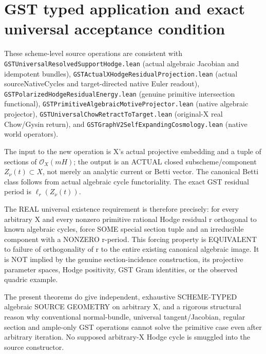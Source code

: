 \documentclass[11pt]{article}
\newcommand{\OO}{\mathcal O}
\begin{document}
\section{GST typed application and exact universal acceptance condition}
These scheme-level source operations are consistent with
\texttt{GSTUniversalResolvedSupportHodge.lean}
(actual algebraic Jacobian and idempotent bundles),
\texttt{GSTActualXHodgeResidualProjection.lean}
(actual sourceNativeCycles and target-directed native
Euler readout),
\texttt{GSTPolarizedHodgeResidualEnergy.lean}
(genuine primitive intersection functional),
\texttt{GSTPrimitiveAlgebraicMotiveProjector.lean}
(native algebraic projector),
\texttt{GSTUniversalChowRetractToTarget.lean}
(original-X real Chow/Gysin return), and
\texttt{GSTGraphV2SelfExpandingCosmology.lean}
(native world operators).

The input to the new operation is X's actual
projective embedding and a tuple of sections of \(\OO_X(mH)\);
the output is an ACTUAL closed subscheme/component
\(Z_\nu(t)\subset X\), not merely an analytic current or
Betti vector. The canonical Betti class follows from
actual algebraic cycle functoriality. The exact
GST residual period is \(\ell_r(Z_\nu(t))\).

The REAL universal existence requirement is therefore
precisely: for every arbitrary X and every nonzero
primitive rational Hodge residual r orthogonal to known
algebraic cycles, force SOME special section tuple
and an irreducible component with a NONZERO r-period.
This forcing property is EQUIVALENT to failure of
orthogonality of r to the entire existing canonical
algebraic image. It is NOT implied by the genuine
section-incidence construction, its projective
parameter spaces, Hodge positivity, GST Gram
identities, or the observed quadric example.

The present theorems do give independent, exhaustive
SCHEME-TYPED algebraic SOURCE GEOMETRY on arbitrary X,
and a rigorous structural reason why conventional
normal-bundle, universal tangent/Jacobian, regular
section and ample-only GST operations cannot solve
the primitive case even after arbitrary iteration.
No supposed arbitrary-X Hodge cycle is smuggled
into the source constructor.
\end{document}
